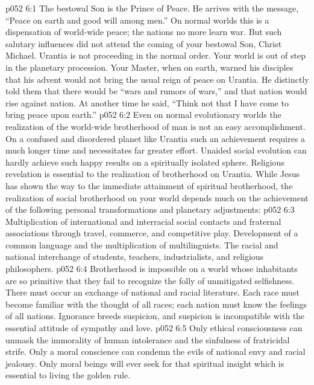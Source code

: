 \vs p052 6:1 The bestowal Son is the Prince of Peace. He arrives with the message, “Peace on earth and good will among men.” On normal worlds this is a dispensation of world\hyp{}wide peace; the nations no more learn war. But such salutary influences did not attend the coming of your bestowal Son, Christ Michael. Urantia is not proceeding in the normal order. Your world is out of step in the planetary procession. Your Master, when on earth, warned his disciples that his advent would not bring the usual reign of peace on Urantia. He distinctly told them that there would be “wars and rumors of wars,” and that nation would rise against nation. At another time he said, “Think not that I have come to bring peace upon earth.”
\vs p052 6:2 Even on normal evolutionary worlds the realization of the world\hyp{}wide brotherhood of man is not an easy accomplishment. On a confused and disordered planet like Urantia such an achievement requires a much longer time and necessitates far greater effort. Unaided social evolution can hardly achieve such happy results on a spiritually isolated sphere. Religious revelation is essential to the realization of brotherhood on Urantia. While Jesus has shown the way to the immediate attainment of spiritual brotherhood, the realization of social brotherhood on your world depends much on the achievement of the following personal transformations and planetary adjustments:
\vs p052 6:3 \bibnobreakspace {} Multiplication of international and interracial social contacts and fraternal associations through travel, commerce, and competitive play. Development of a common language and the multiplication of multilinguists. The racial and national interchange of students, teachers, industrialists, and religious philosophers.
\vs p052 6:4 \pc {}\bibnobreakspace {} Brotherhood is impossible on a world whose inhabitants are so primitive that they fail to recognize the folly of unmitigated selfishness. There must occur an exchange of national and racial literature. Each race must become familiar with the thought of all races; each nation must know the feelings of all nations. Ignorance breeds suspicion, and suspicion is incompatible with the essential attitude of sympathy and love.
\vs p052 6:5 \pc {}\bibnobreakspace {} Only ethical consciousness can unmask the immorality of human intolerance and the sinfulness of fratricidal strife. Only a moral conscience can condemn the evils of national envy and racial jealousy. Only moral beings will ever seek for that spiritual insight which is essential to living the golden rule.
